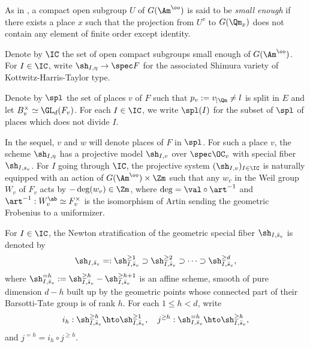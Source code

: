 As in \cite[bottom of p.\,90]{h-t}, a compact open subgroup $U$ of $G(\Am^\oo)$ is said to be
\emph{small enough}
if there exists a place $x$ such that the projection from $U^v$ to $G(\Qm_x)$ does not contain any
element of finite order except identity.

\begin{nota}
Denote by $\IC$ the set of open compact subgroups small enough of $G(\Am^\oo)$.
For $I \in \IC$, write $\sh_{I,\eta} \to \spec F$ for the associated
Shimura variety of Kottwitz-Harris-Taylor type.
\end{nota}

\begin{defin} \label{defi-spl}
Denote by $\spl$ the set of places $v$ of $F$ such that $p_v:=v_{|\Qm} \neq l$ is split in $E$ and let
$B_v^\times \simeq \GL_d(F_v)$. For each $I \in \IC$, we write
$\spl(I)$ for the subset of $\spl$ of places which does not divide $I$.
\end{defin}

In the sequel, $v$ and $w$ will denote places of $F$ in $\spl$.
For such a place $v$,
the scheme $\sh_{I,\eta}$ has a projective model $\sh_{I,v}$ over $\spec \OC_v$
with special fiber $\sh_{I,s_v}$. For $I$ going through $\IC$, the projective system $(\sh_{I,v})_{I\in \IC}$
is naturally equipped with an action of $G(\Am^\oo) \times \Zm$ such that any
$w_v$ in the Weil group $W_v$ of $F_v$ acts by $-\deg (w_v) \in \Zm$,
where $\deg=\val \circ \art^{-1}$ and $\art^{-1}:W_v^{\ab} \simeq F_v^\times$ is the isomorphism of Artin
sending the geometric Frobenius to a uniformizer.

\begin{notas}
For $I \in \IC$, the Newton stratification of the geometric special fiber $\sh_{I,\bar s_v}$ is denoted by
\[
\sh_{I,\bar s_v}=:\sh^{\geq 1}_{I,\bar s_v} \supset \sh^{\geq 2}_{I,\bar s_v} \supset \cdots \supset
\sh^{\geq d}_{I,\bar s_v},
\]
where $\sh^{=h}_{I,\bar s_v}:=\sh^{\geq h}_{I,\bar s_v} - \sh^{\geq h+1}_{I,\bar s_v}$ is an affine
scheme, smooth of pure dimension $d-h$ built up by the geometric
points whose connected part of their Barsotti-Tate group is of rank $h$.
For each $1 \leq h <d$, write
\[
i_{h}:\sh^{\geq h}_{I,\bar s_v} \hto \sh^{\geq 1}_{I,\bar s_v}, \quad
j^{\geq h}: \sh^{=h}_{I,\bar s_v} \hto \sh^{\geq h}_{I,\bar s_v},
\]
and $j^{=h}=i_h \circ j^{\geq h}$.
\end{notas}

